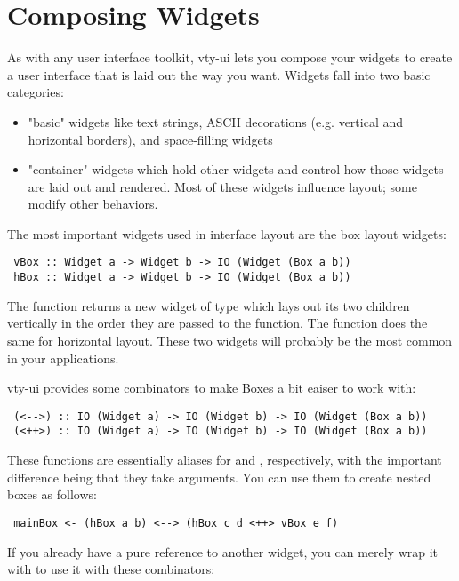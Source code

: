\section{Composing Widgets}

As with any user interface toolkit, vty-ui lets you compose your widgets
to create a user interface that is laid out the way you want.  Widgets
fall into two basic categories:

\begin{itemize}
\item "basic" widgets like text strings, ASCII decorations
      (e.g. vertical and horizontal borders), and space-filling
      widgets
\item "container" widgets which hold other widgets and control how
      those widgets are laid out and rendered.  Most of these widgets
      influence layout; some modify other behaviors.
\end{itemize}

The most important widgets used in interface layout are the box layout
widgets:

\begin{verbatim}
 vBox :: Widget a -> Widget b -> IO (Widget (Box a b))
 hBox :: Widget a -> Widget b -> IO (Widget (Box a b))
\end{verbatim}

The  function returns a new widget of type  which lays out its two children vertically in the order they are
passed to the function.  The  function does the same for
horizontal layout.  These two widgets will probably be the most common
in your applications.

vty-ui provides some combinators to make Boxes a bit eaiser to work
with:

\begin{verbatim}
 (<-->) :: IO (Widget a) -> IO (Widget b) -> IO (Widget (Box a b))
 (<++>) :: IO (Widget a) -> IO (Widget b) -> IO (Widget (Box a b))
\end{verbatim}

These functions are essentially aliases for  and ,
respectively, with the important difference being that they take
 arguments.  You can use them to create nested boxes as
follows:

\begin{verbatim}
 mainBox <- (hBox a b) <--> (hBox c d <++> vBox e f)
\end{verbatim}

If you already have a pure reference to another widget, you can merely
wrap it with  to use it with these combinators:

